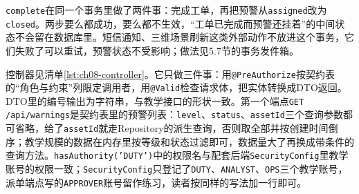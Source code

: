 \texttt{complete}在同一个事务里做了两件事：完成工单，再把预警从\texttt{assigned}改为\texttt{closed}。两步要么都成功，要么都不生效，“工单已完成而预警还挂着”的中间状态不会留在数据库里。短信通知、三维场景刷新这类外部动作不放进这个事务，它们失败了可以重试，预警状态不受影响；做法见5.7节的事务发件箱。

控制器见清单\ref{lst:ch08-controller}。它只做三件事：用\texttt{@PreAuthorize}按契约表的“角色与约束”列限定调用者，用\texttt{@Valid}检查请求体，把实体转换成DTO返回。DTO里的编号输出为字符串，与教学接口的形状一致。第一个端点\texttt{GET /api/warnings}是契约表里的预警列表：\texttt{level}、\texttt{status}、\texttt{assetId}三个查询参数都可省略，给了\texttt{assetId}就走Repository的派生查询，否则取全部并按创建时间倒序；教学规模的数据在内存里按等级和状态过滤即可，数据量大了再换成带条件的查询方法。\texttt{hasAuthority('DUTY')}中的权限名与配套后端\texttt{SecurityConfig}里教学账号的权限一致；\texttt{SecurityConfig}只登记了\texttt{DUTY}、\texttt{ANALYST}、\texttt{OPS}三个教学账号，派单端点写的\texttt{APPROVER}账号留作练习，读者按同样的写法加一行即可。

